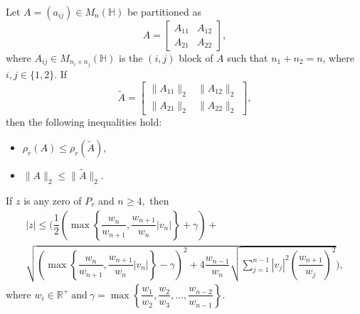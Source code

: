 \documentclass[10pt,a4paper]{amsart}
\begin{document}
\begin{lemma}{\label{lemma 3.5}}
	Let \( A = (a_{ij}) \in M_n(\mathbb{H}) \) be partitioned as
	\[
	A = \begin{bmatrix}
		A_{11} & A_{12} \\
		A_{21} & A_{22}
	\end{bmatrix},
	\]
	where \( A_{ij} \in M_{n_i \times n_j}(\mathbb{H}) \) is the \((i,j)\) block of \( A \) such that \( n_1 + n_2 = n \), where \( i,j \in \{1,2\} \). If
	\[
	\tilde{A} = \begin{bmatrix}
		\|A_{11}\|_2 & \|A_{12}\|_2 \\
		\|A_{21}\|_2 & \|A_{22}\|_2
	\end{bmatrix},
	\]
	then the following inequalities hold:
	\begin{itemize}
		\item \( \rho_r(A) \leq \rho_r(\tilde{A}) \),
		\item \( \|A\|_2 \leq \|\tilde{A}\|_2 \).
	\end{itemize}
\end{lemma}

\begin{theorem}\label{th:03}
	If $z$ is any zero of $P_{r}$ and $n\ge 4,$ then
	\begin{multline*}
		|z|\le \biggl(\dfrac{1}{2}                                  \left( \max \left\{ \dfrac{w_{n}}{w_{n+1}},\dfrac{w_{n+1}}{w_{n}}|v_{n}|\right\}+\gamma\right)+\\\sqrt{   \left( \max \left\{ \dfrac{w_{n}}{w_{n+1}},\dfrac{w_{n+1}}{w_{n}}|v_{n}|\right\}-\gamma\right)^{2}    +4\dfrac{w_{n-1}}{w_{n}} \sqrt{\sum_{j=1}^{n-1}|v_{j}|^{2}\left(\dfrac{w_{n+1}}{w_{j}}\right)^{2}}} \biggr),
	\end{multline*}
	where $w_{i}\in\mathbb{R^{+}}~ \mbox{and}~ \gamma=\max\left\{\dfrac{w_{1}}{w_{2}} ,  \dfrac{w_{2}}{w_{3}},\dots,\dfrac{w_{n-2}}{w_{n-1}}           \right\}. $
\end{theorem}
\end{document}
